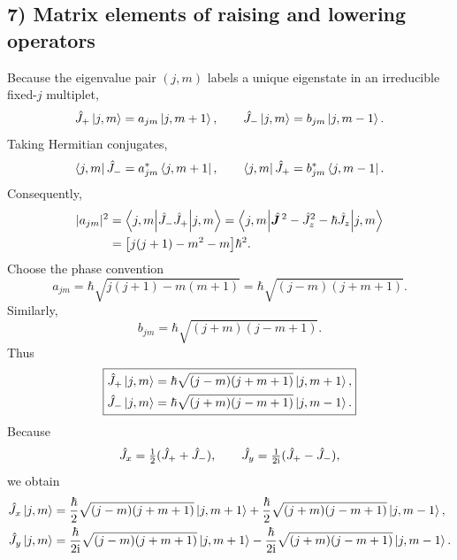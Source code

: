 \subsection*{7) Matrix elements of raising and lowering operators}
Because the eigenvalue pair $(j,m)$ labels a unique eigenstate in an irreducible fixed-$j$ multiplet,
\begin{equation}
\hat{J}_+\left|j,m\right\rangle=a_{jm}\left|j,m+1\right\rangle,\qquad
\hat{J}_-\left|j,m\right\rangle=b_{jm}\left|j,m-1\right\rangle.
\end{equation}
Taking Hermitian conjugates,
\begin{equation}
\left\langle j,m\right|\hat{J}_-=a_{jm}^*\left\langle j,m+1\right|,\qquad
\left\langle j,m\right|\hat{J}_+=b_{jm}^*\left\langle j,m-1\right|.
\end{equation}
Consequently,
\begin{equation}\begin{aligned}
|a_{jm}|^2
&=\left\langle j,m\middle|\hat{J}_-\hat{J}_+\middle|j,m\right\rangle
=\left\langle j,m\middle|\hat{\bm{J}}^{\,2}-\hat{J}_z^2-\hbar\hat{J}_z\middle|j,m\right\rangle\\
&=\big[j(j+1)-m^2-m\big]\hbar^2.
\end{aligned}\end{equation}
Choose the phase convention
\begin{equation}
a_{jm}=\hbar\sqrt{j(j+1)-m(m+1)}
=\hbar\sqrt{(j-m)(j+m+1)}.
\end{equation}
Similarly,
\begin{equation}
b_{jm}=\hbar\sqrt{(j+m)(j-m+1)}.
\end{equation}
Thus
\begin{equation}
\boxed{\begin{aligned}
\hat{J}_+\left|j,m\right\rangle&=\hbar\sqrt{(j-m)(j+m+1)}\left|j,m+1\right\rangle,\\
\hat{J}_-\left|j,m\right\rangle&=\hbar\sqrt{(j+m)(j-m+1)}\left|j,m-1\right\rangle.
\end{aligned}}
\end{equation}
Because
\begin{equation}
\hat{J}_x=\tfrac12(\hat{J}_++\hat{J}_-),\qquad
\hat{J}_y=\tfrac1{2\mathrm{i}}(\hat{J}_+-\hat{J}_-),
\end{equation}
we obtain
\begin{equation}\begin{aligned}
\hat{J}_x\left|j,m\right\rangle&=\frac\hbar2\sqrt{(j-m)(j+m+1)}\left|j,m+1\right\rangle
+\frac\hbar2\sqrt{(j+m)(j-m+1)}\left|j,m-1\right\rangle,\\
\hat{J}_y\left|j,m\right\rangle&=\frac\hbar{2\mathrm{i}}\sqrt{(j-m)(j+m+1)}\left|j,m+1\right\rangle
-\frac\hbar{2\mathrm{i}}\sqrt{(j+m)(j-m+1)}\left|j,m-1\right\rangle.
\end{aligned}\end{equation}

